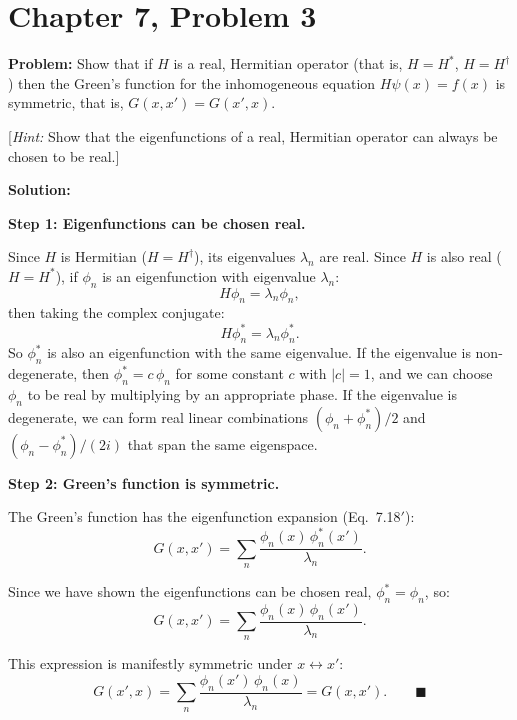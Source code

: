 \documentclass[12pt]{article}
\begin{document}
\section*{Chapter 7, Problem 3}

\textbf{Problem:} Show that if $H$ is a real, Hermitian operator (that is, $H = H^*$, $H = H^\dagger$) then the Green's function for the inhomogeneous equation $H\psi(x) = f(x)$ is symmetric, that is, $G(x,x') = G(x',x)$.

[\textit{Hint:} Show that the eigenfunctions of a real, Hermitian operator can always be chosen to be real.]

\bigskip
\textbf{Solution:}

\textbf{Step 1: Eigenfunctions can be chosen real.}

Since $H$ is Hermitian ($H = H^\dagger$), its eigenvalues $\lambda_n$ are real. Since $H$ is also real ($H = H^*$), if $\phi_n$ is an eigenfunction with eigenvalue $\lambda_n$:
\[
H\phi_n = \lambda_n \phi_n,
\]
then taking the complex conjugate:
\[
H\phi_n^* = \lambda_n \phi_n^*.
\]
So $\phi_n^*$ is also an eigenfunction with the same eigenvalue. If the eigenvalue is non-degenerate, then $\phi_n^* = c\,\phi_n$ for some constant $c$ with $|c|=1$, and we can choose $\phi_n$ to be real by multiplying by an appropriate phase. If the eigenvalue is degenerate, we can form real linear combinations $(\phi_n + \phi_n^*)/2$ and $(\phi_n - \phi_n^*)/(2i)$ that span the same eigenspace.

\textbf{Step 2: Green's function is symmetric.}

The Green's function has the eigenfunction expansion (Eq.\ 7.18$'$):
\[
G(x,x') = \sum_n \frac{\phi_n(x)\,\phi_n^*(x')}{\lambda_n}.
\]

Since we have shown the eigenfunctions can be chosen real, $\phi_n^* = \phi_n$, so:
\[
G(x,x') = \sum_n \frac{\phi_n(x)\,\phi_n(x')}{\lambda_n}.
\]

This expression is manifestly symmetric under $x \leftrightarrow x'$:
\[
G(x',x) = \sum_n \frac{\phi_n(x')\,\phi_n(x)}{\lambda_n} = G(x,x'). \qquad \blacksquare
\]
\end{document}
